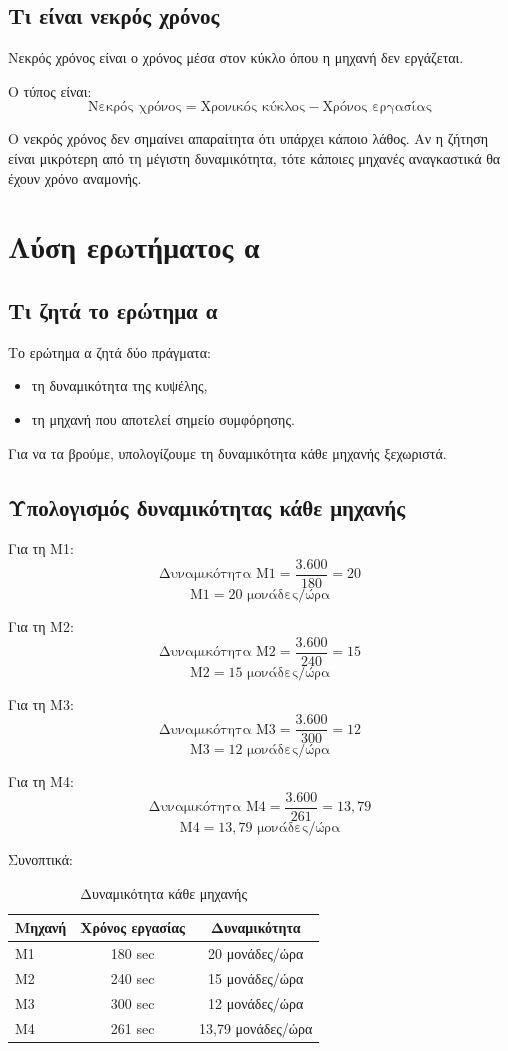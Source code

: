 \documentclass[12pt,a4paper]{article}
\begin{document}
\subsection{Τι είναι νεκρός χρόνος}

Νεκρός χρόνος είναι ο χρόνος μέσα στον κύκλο όπου η μηχανή δεν εργάζεται.

Ο τύπος είναι:
\[
\text{Νεκρός χρόνος}=
\text{Χρονικός κύκλος}-\text{Χρόνος εργασίας}
\]

Ο νεκρός χρόνος δεν σημαίνει απαραίτητα ότι υπάρχει κάποιο λάθος. Αν η ζήτηση είναι μικρότερη από τη μέγιστη δυναμικότητα, τότε κάποιες μηχανές αναγκαστικά θα έχουν χρόνο αναμονής.

\section{Λύση ερωτήματος α}

\subsection{Τι ζητά το ερώτημα α}

Το ερώτημα α ζητά δύο πράγματα:

\begin{itemize}
    \item τη δυναμικότητα της κυψέλης,
    \item τη μηχανή που αποτελεί σημείο συμφόρησης.
\end{itemize}

Για να τα βρούμε, υπολογίζουμε τη δυναμικότητα κάθε μηχανής ξεχωριστά.

\subsection{Υπολογισμός δυναμικότητας κάθε μηχανής}

Για τη Μ1:
\[
\text{Δυναμικότητα Μ1}=\frac{3.600}{180}=20
\]
\[
\boxed{\text{Μ1}=20 \text{ μονάδες/ώρα}}
\]

Για τη Μ2:
\[
\text{Δυναμικότητα Μ2}=\frac{3.600}{240}=15
\]
\[
\boxed{\text{Μ2}=15 \text{ μονάδες/ώρα}}
\]

Για τη Μ3:
\[
\text{Δυναμικότητα Μ3}=\frac{3.600}{300}=12
\]
\[
\boxed{\text{Μ3}=12 \text{ μονάδες/ώρα}}
\]

Για τη Μ4:
\[
\text{Δυναμικότητα Μ4}=\frac{3.600}{261}=13{,}79
\]
\[
\boxed{\text{Μ4}=13{,}79 \text{ μονάδες/ώρα}}
\]

Συνοπτικά:

\begin{table}[H]
\centering
\caption{Δυναμικότητα κάθε μηχανής}
\begin{tabular}{lcc}
\toprule
\textbf{Μηχανή} & \textbf{Χρόνος εργασίας} & \textbf{Δυναμικότητα} \\
\midrule
Μ1 & 180 sec & 20 μονάδες/ώρα \\
Μ2 & 240 sec & 15 μονάδες/ώρα \\
Μ3 & 300 sec & 12 μονάδες/ώρα \\
Μ4 & 261 sec & 13,79 μονάδες/ώρα \\
\bottomrule
\end{tabular}
\end{table}
\end{document}
